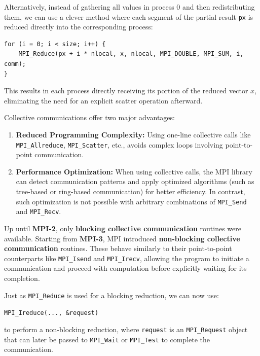 \documentclass[12pt]{book}
\begin{document}
Alternatively, instead of gathering all values in process 0 and then redistributing them, we can use a clever method where each segment of the partial result \texttt{px} is reduced directly into the corresponding process:

\begin{lstlisting}[style=cppstyle]
for (i = 0; i < size; i++) {
    MPI_Reduce(px + i * nlocal, x, nlocal, MPI_DOUBLE, MPI_SUM, i, comm);
}
\end{lstlisting}

This results in each process directly receiving its portion of the reduced vector $x$, eliminating the need for an explicit scatter operation afterward.

\vspace{1em}
Collective communications offer two major advantages:
\begin{enumerate}
    \item \textbf{Reduced Programming Complexity:} Using one-line collective calls like \texttt{MPI\_Allreduce}, \texttt{MPI\_Scatter}, etc., avoids complex loops involving point-to-point communication.
    \item \textbf{Performance Optimization:} When using collective calls, the MPI library can detect communication patterns and apply optimized algorithms (such as tree-based or ring-based communication) for better efficiency. In contrast, such optimization is not possible with arbitrary combinations of \texttt{MPI\_Send} and \texttt{MPI\_Recv}.
\end{enumerate}

Up until \textbf{MPI-2}, only \textbf{blocking collective communication} routines were available. Starting from \textbf{MPI-3}, MPI introduced \textbf{non-blocking collective communication} routines. These behave similarly to their point-to-point counterparts like \texttt{MPI\_Isend} and \texttt{MPI\_Irecv}, allowing the program to initiate a communication and proceed with computation before explicitly waiting for its completion.

Just as \texttt{MPI\_Reduce} is used for a blocking reduction, we can now use:
\begin{center}
    \texttt{MPI\_Ireduce(..., \&request)}
\end{center}
to perform a non-blocking reduction, where \texttt{request} is an \texttt{MPI\_Request} object that can later be passed to \texttt{MPI\_Wait} or \texttt{MPI\_Test} to complete the communication.
\end{document}
